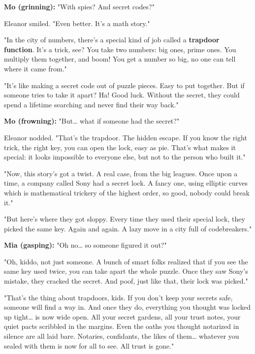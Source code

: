 \textbf{Mo (grinning):} "With spies? And secret codes?"

\medskip

Eleanor smiled. "Even better. It’s a math story."

"In the city of numbers, there’s a special kind of job called a \textbf{trapdoor function}. It’s a trick, see? You take two numbers: big ones, prime ones. You multiply them together, and boom! You get a number so big, no one can tell where it came from."

"It’s like making a secret code out of puzzle pieces. Easy to put together. But if someone tries to take it apart? Ha! Good luck. Without the secret, they could spend a lifetime searching and never find their way back."

\medskip

\textbf{Mo (frowning):} "But… what if someone had the secret?"

Eleanor nodded. "That’s the trapdoor. The hidden escape. If you know the right trick, the right key, you can open the lock, easy as pie. That’s what makes it special: it looks impossible to everyone else, but not to the person who built it."

\smallskip

"Now, this story’s got a twist. A real case, from the big leagues. Once upon a time, a company called Sony had a secret lock. A fancy one, using elliptic curves which is mathematical trickery of the highest order, so good, nobody could break it."

"But here’s where they got sloppy. Every time they used their special lock, they picked the same key. Again and again. A lazy move in a city full of codebreakers."

\smallskip

\textbf{Mia (gasping):} "Oh no… so someone figured it out?"

"Oh, kiddo, not just someone. A bunch of smart folks realized that if you see the same key used twice, you can take apart the whole puzzle. Once they saw Sony’s mistake, they cracked the secret. And poof, just like that, their lock was picked."

"That’s the thing about trapdoors, kids. If you don’t keep your secrets safe, someone will find a way in. And once they do, everything you thought was locked up tight… is now wide open. All your secret gardens, all your trust notes, your quiet pacts scribbled in the margins. Even the oaths you thought notarized in silence are all laid bare. Notaries, confidants, the likes of them… whatever you sealed with them is now for all to see. All trust is gone."

